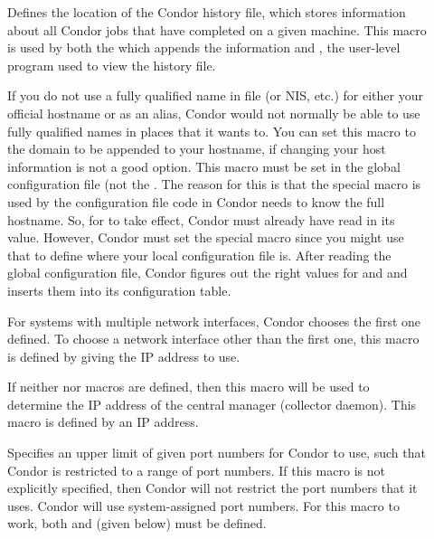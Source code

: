 \begin{description}
\item[] \label{param:History} Defines the
  location of the Condor history file, which stores information about
  all Condor jobs that have completed on a given machine.  This macro
  is used by both the  which appends the information
  and , the user-level program used to view
  the history file.

\item[] \label{param:DefaultDomainName}
  If you do not use a fully qualified name in file 
  (or NIS, etc.) for either your official hostname or as an
  alias, Condor would not normally be able to use fully qualified names
  in places that it wants to.  You can set this macro to the
  domain to be appended to your hostname, if changing your host
  information is not a good option.  This macro must be set in the
  global configuration file (not the .
  The reason for this is that the special 
  macro is used by the configuration file code in Condor needs
  to know the full hostname.  So, for  to
  take effect, Condor must already have read in its value.  However,
  Condor must set the  special macro since you
  might use that to define where your local configuration file is.  After
  reading the global configuration file, Condor figures out the right values
  for  and  and inserts them
  into its configuration table.

\item[] \label{param:NetworkInterface}
  For systems with multiple network interfaces, Condor chooses the
  first one defined.  To choose a network interface other than the
  first one, this macro is defined by giving the IP address
  to use.

\item[] \label{param:CMIPAddr}
  If neither  nor 
   macros are defined, then this
  macro will be used to determine the IP address of the central
  manager (collector daemon).
  This macro is defined by an IP address.

\item[] \label{param:HighPort}
  Specifies an upper limit of given port numbers for Condor to use,
  such that Condor is restricted to a range of port numbers.
  If this macro is not explicitly specified, then Condor will
  not restrict the port numbers that it uses. Condor will use
  system-assigned port numbers.
  For this macro to work, both  and
   (given below) must be defined.


\end{description}
